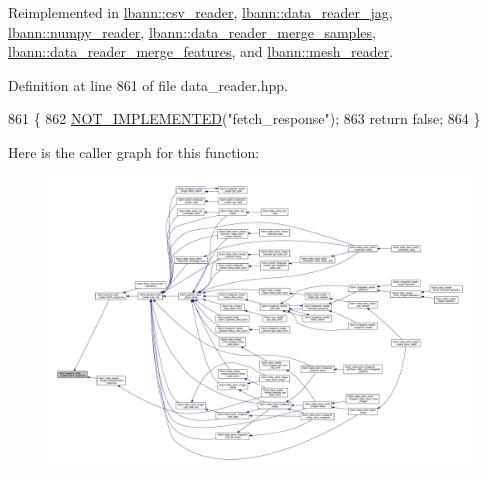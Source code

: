 Reimplemented in \hyperlink{classlbann_1_1csv__reader_ab4bbc1b0a9982595b89a930cc125b40b}{lbann\+::csv\+\_\+reader}, \hyperlink{classlbann_1_1data__reader__jag_ad9b4259f23a9744ec1c86c688a67f583}{lbann\+::data\+\_\+reader\+\_\+jag}, \hyperlink{classlbann_1_1numpy__reader_ad7c3a680426ffcf467d74ba3a5e6eb20}{lbann\+::numpy\+\_\+reader}, \hyperlink{classlbann_1_1data__reader__merge__samples_ab39ad6b6e106eb30f58f9eabaf3352ad}{lbann\+::data\+\_\+reader\+\_\+merge\+\_\+samples}, \hyperlink{classlbann_1_1data__reader__merge__features_afd9fa7d10c466eca62ac7af3cbc3ddcb}{lbann\+::data\+\_\+reader\+\_\+merge\+\_\+features}, and \hyperlink{classlbann_1_1mesh__reader_acc56c299c9ec75506d2780d2098cbe99}{lbann\+::mesh\+\_\+reader}.



Definition at line 861 of file data\+\_\+reader.\+hpp.


\begin{DoxyCode}
861                                                                         \{
862     \hyperlink{data__reader_8hpp_a10d485225119e927ae18857acf81bdc6}{NOT\_IMPLEMENTED}(\textcolor{stringliteral}{"fetch\_response"});
863     \textcolor{keywordflow}{return} \textcolor{keyword}{false};
864   \}
\end{DoxyCode}
Here is the caller graph for this function\+:\nopagebreak
\begin{figure}[H]
\begin{center}
\leavevmode
\includegraphics[width=350pt]{classlbann_1_1generic__data__reader_abe544ea807eed477f3636010d199b574_icgraph}
\end{center}
\end{figure}
\mbox{\label{classlbann_1_1generic__data__reader_aeaa97d3683add33d1c6d69a769dd6a20}} 
